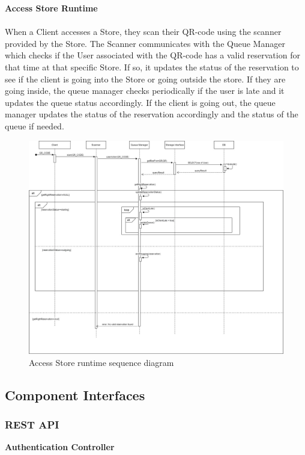 \documentclass[a4paper, 12pt, oneside, table]{article}
\begin{document}
\textbf{Access Store Runtime}\\
\\
When a Client accesses a Store, they scan their QR-code using the scanner provided by the Store. The Scanner communicates with the Queue Manager which checks if the User associated with the QR-code has a valid reservation for that time at that specific Store. If so, it updates the status of the reservation to see if the client is going into the Store or going outside the store. If they are going inside, the queue manager checks periodically if the user is late and it updates the queue status accordingly. If the client is going out, the queue manager updates the status of the reservation accordingly and the status of the queue if needed.
\begin{figure}[H]
\centering
    \centering
    \includegraphics[height=0.5\textheight, scale=0.5, keepaspectratio]{img/seq_diag/AccessStore.jpg}
    \caption{Access Store runtime sequence diagram}
    \label{accessStoreRunTime}
\end{figure}

\subsection{Component Interfaces}
\subsubsection{REST API}
\textbf{\large Authentication Controller}\\
\end{document}
